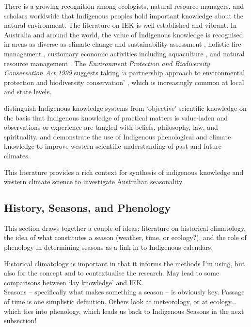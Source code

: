 There is a growing recognition among ecologists, natural resource managers, and 
scholars worldwide that Indigenous peoples hold important knowledge about the 
natural environment. The literature on IEK is well-established and vibrant.  In 
Australia and around the world, the value of Indigenous knowledge is recognised 
in areas as diverse as climate change and sustainability assessment
\citep[eg.][]{cochran2015}, holistic fire management \citep[eg.][]{clarke2009,price2012}, 
customary economic activities including aquaculture \citep{woodward2012a}, and 
natural resource management \citep[eg.][]{prober2011}.  The \textit{Environment 
Protection and Biodiversity Conservation Act 1999} suggests taking `a 
partnership approach to environmental protection and biodiversity conservation'
\citep{ens2012}, which is increasingly common at local and state levels.  

\citet{turner2009} distinguish Indigenous knowledge systems from `objective' 
scientific knowledge on the basis that Indigenous knowledge of practical 
matters is value-laden and observations or experience are tangled with beliefs, 
philosophy, law, and spirituality.  \citet{green2010a} and \citet{clarke2009} 
demonstrate the use of Indigenous phenological and climate knowledge to improve 
western scientific understanding of past and future climates.  

This literature provides a rich context for synthesis of indigenous knowledge 
and western climate science to investigate Australian seasonality.


\subsection{History, Seasons, and Phenology}
This section draws together a couple of ideas:  literature on historical 
climatology, the idea of what constitutes a season (weather, time, or ecology?),
and the role of phenology in determining seasons as a link in to Indigenous 
calendars.

Historical climatology is important in that it informs the methods I'm 
using, but also for the concept and to contextualise the research.  May lead to 
some comparisons between `lay knowledge' and IEK.\\

Seasons – specifically what makes something a season – is obviously key.  
Passage of time is one simplistic definition.  Others look at meteorology, or 
at ecology... which ties into phenology, which leads us back to Indigenous
Seasons in the next subsection!


